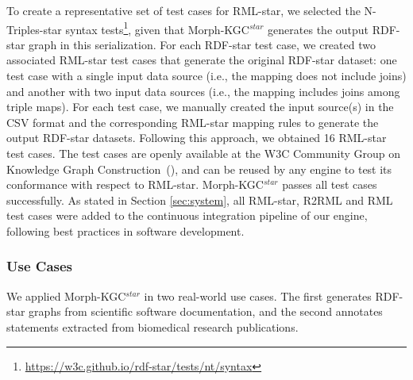 To create a representative set of test cases for \mbox{RML-star}, we selected the N-Triples-star syntax tests\footnote{\url{https://w3c.github.io/rdf-star/tests/nt/syntax}}, given that \mbox{Morph-KGC$^{star}$} generates the output RDF-star graph in this serialization.  %
For each \mbox{RDF-star} test case, we created two associated \mbox{RML-star} test cases that generate the original \mbox{RDF-star} dataset: one test case with a single input data source (i.e., the mapping does not include joins) and another with two input data sources (i.e., the mapping includes joins among triple maps).
For each test case, we manually created the input source(s) in the CSV format and the corresponding \mbox{RML-star} mapping rules to generate the output \mbox{RDF-star} datasets.
Following this approach, we obtained 16 \mbox{RML-star} test cases.
The test cases are openly available at the W3C Community Group on Knowledge Graph Construction~(\cite{david_chaves_2022_6518802}),
and can be reused by any engine to test its conformance with respect to \mbox{RML-star}.
\mbox{Morph-KGC$^{star}$} passes all test cases successfully. As stated in Section \ref{sec:system}, all \mbox{RML-star}, R2RML and RML test cases were added to the continuous integration pipeline of our engine, following best practices in software development.


\subsubsection{Use Cases}

We applied \mbox{Morph-KGC$^{star}$} in two real-world use cases. 
The first generates \mbox{RDF-star} graphs from scientific software documentation, 
and the second annotates statements extracted from biomedical research publications.















